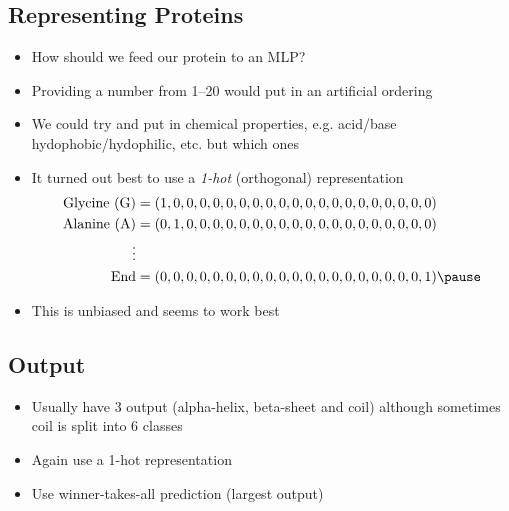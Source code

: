 
\begin{slide}
\section[-2]{Representing Proteins}

\begin{PauseHighLight}
  \begin{itemize}
  \item How should we feed our protein to an MLP?\pause
  \item Providing a number from 1--20 would put in an artificial
    ordering\pause
  \item We could try and put in chemical properties, e.g. acid/base
    hydophobic/hydophilic, etc.\pause{} but which ones\pause
  \item It turned out best to use a \emph{1-hot} (orthogonal) representation
    \begin{align*}
      \text{Glycine (G)} &= (1,0,0,0,0,0,0,0,0,0,0,0,0,0,0,0,0,0,0,0,0) \\
      \text{Alanine (A)} &= (0,1,0,0,0,0,0,0,0,0,0,0,0,0,0,0,0,0,0,0,0) \\
      \vdots\\
      \text{End} &= (0,0,0,0,0,0,0,0,0,0,0,0,0,0,0,0,0,0,0,0,1)\pause
    \end{align*}
  \item This is unbiased and seems to work best\pause
  \end{itemize}
\end{PauseHighLight}

\end{slide}


\begin{slide}
\section{Output}

\begin{PauseHighLight}
  \begin{itemize}
  \item Usually have 3 output (alpha-helix, beta-sheet and coil)
    although sometimes coil is split into 6 classes\pause
  \item Again use a 1-hot representation\pause
  \item Use winner-takes-all prediction (largest output)\pause
  \end{itemize}
\end{PauseHighLight}

\end{slide}

